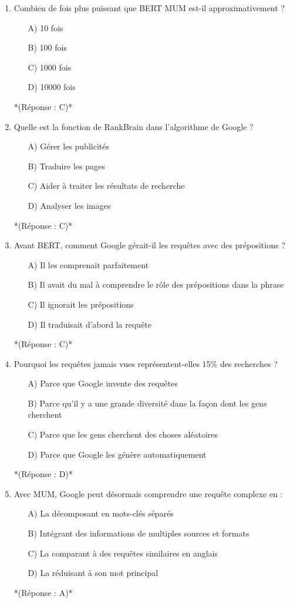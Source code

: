 \documentclass[12pt,a4paper,twoside]{report}
\begin{document}
\begin{enumerate}
\item Combien de fois plus puissant que BERT MUM est-il approximativement ?
\begin{itemize}
\item[A)] 10 fois
\item[B)] 100 fois
\item[C)] 1000 fois
\item[D)] 10000 fois
\end{itemize}
*(Réponse : C)*

\item Quelle est la fonction de RankBrain dans l'algorithme de Google ?
\begin{itemize}
\item[A)] Gérer les publicités
\item[B)] Traduire les pages
\item[C)] Aider à traiter les résultats de recherche
\item[D)] Analyser les images
\end{itemize}
*(Réponse : C)*

\item Avant BERT, comment Google gérait-il les requêtes avec des prépositions ?
\begin{itemize}
\item[A)] Il les comprenait parfaitement
\item[B)] Il avait du mal à comprendre le rôle des prépositions dans la phrase
\item[C)] Il ignorait les prépositions
\item[D)] Il traduisait d'abord la requête
\end{itemize}
*(Réponse : C)*

\item Pourquoi les requêtes jamais vues représentent-elles 15\% des recherches ?
\begin{itemize}
\item[A)] Parce que Google invente des requêtes
\item[B)] Parce qu'il y a une grande diversité dans la façon dont les gens cherchent
\item[C)] Parce que les gens cherchent des choses aléatoires
\item[D)] Parce que Google les génère automatiquement
\end{itemize}
*(Réponse : D)*

\item Avec MUM, Google peut désormais comprendre une requête complexe en :
\begin{itemize}
\item[A)] La décomposant en mots-clés séparés
\item[B)] Intégrant des informations de multiples sources et formats
\item[C)] La comparant à des requêtes similaires en anglais
\item[D)] La réduisant à son mot principal
\end{itemize}
*(Réponse : A)*


\end{enumerate}
\end{document}
